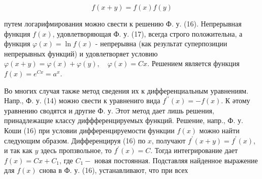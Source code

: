 \documentclass[10pt]{article}
\begin{document}
\[

f(x+y)=f(x) f(y)

\]



путем логарифмирования можно свести к решению Ф. у. (16). Непрерывная функция $f(x)$, удовлетворяющая Ф. у. (17), всегда строго положительна, а функция $\varphi(x)=\ln f(x)$ - непрерывна (как результат суперпозиции непрерывных функций) и удовлетворяет условию $\varphi(x+y)=\varphi(x)+\varphi(y), \quad \varphi(x)=C x$. Решением является функция $f(x)=e^{C x}=a^{x}$.



Во многих случая также метод сведения их к дифференциальным уравнениям. Напр., Ф. у. (14) можно свести к уравнениго вида $f^{\prime \prime}(x)=-f(x)$. К әтому уравнению сводятся и другие Ф. у. Этот метод дает лишь решения, принадлежащие классу диффференцируемых функций. Решение, напр., Ф. у. Коши (16) при условии дифференцируемости функции $f(x)$ можно найти следующим образом. Дифференцируя (16) по $x$, получают $f^{\prime}(x+y)=f^{\prime}(x)$, и так как $y$ здесь пропзвольное, то $f^{\prime}(x)=C$. Тогда интегрирование дает $f(x)=C x+C_{1}$, где $C_{1}-$ новая постоянная. Подставляя найденное выражение для $f(x)$ снова в Ф. у. (16), устанавливают, что при всех
\end{document}
